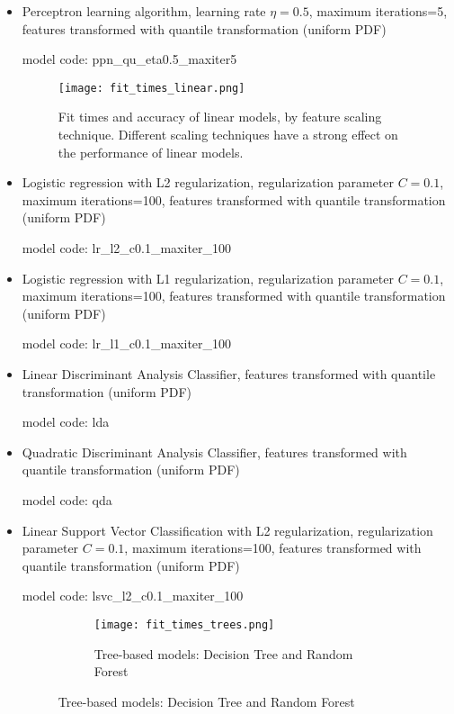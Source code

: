 \begin{itemize}

    \item Perceptron learning algorithm, learning rate $\eta=0.5$, maximum iterations=5, features transformed with quantile transformation (uniform PDF)

    model code: ppn\_qu\_eta0.5\_maxiter5

    \begin{figure}[hbt!]
        \centering
        \texttt{[image: fit\_times\_linear.png]}
        \caption{Fit times and accuracy of linear models, by feature scaling technique.
        Different scaling techniques have a strong effect on the performance of linear models.}
        \label{fig:fit_times_linear}
    \end{figure}

    \item Logistic regression with L2 regularization, regularization parameter $C=0.1$, maximum iterations=100, features transformed with quantile transformation (uniform PDF)

    model code: lr\_l2\_c0.1\_maxiter\_100

    \item Logistic regression with L1 regularization, regularization parameter $C=0.1$, maximum iterations=100, features transformed with quantile transformation (uniform PDF)

    model code: lr\_l1\_c0.1\_maxiter\_100

    \item Linear Discriminant Analysis Classifier, features transformed with quantile transformation (uniform PDF)

    model code: lda

    \item Quadratic Discriminant Analysis Classifier, features transformed with quantile transformation (uniform PDF)

    model code: qda

    \item Linear Support Vector Classification with L2 regularization, regularization parameter $C=0.1$, maximum iterations=100, features transformed with quantile transformation (uniform PDF)

    model code: lsvc\_l2\_c0.1\_maxiter\_100

    \begin{figure}[ht]
        \centering
        \begin{subfigure}{\linewidth}
            \centering
            \texttt{[image: fit\_times\_trees.png]}
            \label{fig:fit_times_trees}
            \caption{Tree-based models: Decision Tree and Random Forest}
        \end{subfigure}


\end{figure}
\end{itemize}
